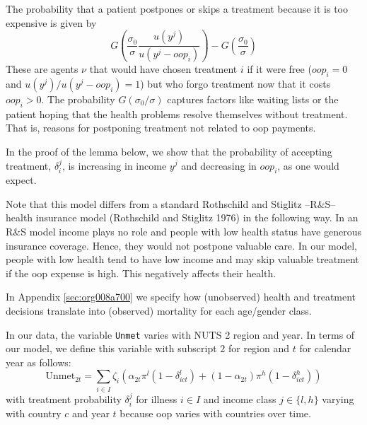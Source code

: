 \documentclass[a4paper,12pt]{article}
\makeatletter
\newcommand{\citeprocitem}[2]{\hyper@linkstart{cite}{citeproc_bib_item_#1}#2\hyper@linkend}
\makeatother
\begin{document}
The probability that a patient postpones or skips a treatment because it is too expensive is given by
\begin{equation}
\label{eq:3}
G\left( \frac{\sigma_0}{\sigma} \frac{u(y^{j})}{u(y^{j}-oop_{i})} \right) - G\left( \frac{\sigma_0}{\sigma} \right)
\end{equation}
These are agents \(\nu\) that would have chosen treatment \(i\) if it were free (\(oop_{i}=0\) and \(u(y^j)/u(y^j-oop_i)=1\)) but who forgo treatment now that it costs \(oop_{i}>0\). The probability \(G(\sigma_{0}/\sigma)\) captures factors like waiting lists or the patient hoping that the health problems resolve themselves without treatment. That is, reasons for postponing treatment not related to oop payments.

In the proof of the lemma below, we show that the probability of accepting treatment, \(\delta_i^j\), is increasing in income \(y^j\) and decreasing in \(oop_{i}\), as one would expect.

Note that this model differs from a standard Rothschild and Stiglitz --R\&S-- health insurance model (\citeprocitem{23}{Rothschild and Stiglitz 1976}) in the following way. In an R\&S model income plays no role and people with low health status have generous insurance coverage. Hence, they would not postpone valuable care. In our model, people with low health tend to have low income and may skip valuable treatment if the oop expense is high. This negatively affects their health.

In Appendix \ref{sec:org008a700} we specify how (unobserved) health and treatment decisions translate into (observed) mortality for each age/gender class.

In our data, the variable \texttt{Unmet} varies with NUTS 2 region and year. In terms of our model, we define this variable with subscript \(2\) for region and \(t\) for calendar year as follows:
\begin{equation}
\label{eq:Unmet}
\text{Unmet}_{2t} = \sum_{i \in I} \zeta_i (\alpha_{2t} \pi^l (1-\delta^l_{ict}) + (1-\alpha_{2t}) \pi^h (1-\delta^h_{ict}))
\end{equation}
with treatment probability \(\delta^j_i\) for illness \(i \in I\) and income class \(j \in \{l,h\}\) varying with country \(c\) and year \(t\) because oop varies with countries over time.
\end{document}

